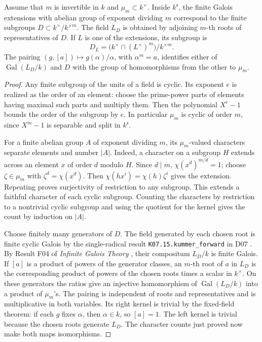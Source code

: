 \begin{theorem}
\label{res:GH07}
Assume that \(m\) is invertible in \(k\) and
\(\mu_m\subset k^\times\). Inside \(k^{\mathrm s}\), the finite Galois
extensions with abelian group of exponent dividing \(m\)
correspond to the finite subgroups \(D\subset k^\times/k^{\times m}\).
The field \(L_D\) is obtained by adjoining \(m\)-th roots of
representatives of \(D\). If \(L\) is one of the extensions, its
subgroup is
\[
 D_L=\bigl(k^\times\cap (L^\times)^m\bigr)/k^{\times m}.
\]
The pairing \((g,[a])\mapsto g(\alpha)/\alpha\), with \(\alpha^m=a\),
identifies either of \(\operatorname{Gal}(L_D/k)\) and \(D\) with the
group of homomorphisms from the other to \(\mu_m\).
\end{theorem}
\begin{proof}
Any finite subgroup of the units of a field is cyclic. Its exponent
\(e\) is realized as the order of an element: choose the prime-power
parts of elements having maximal such parts and multiply them.
Then the polynomial \(X^e-1\) bounds the order of the subgroup by \(e\).
In particular \(\mu_m\) is cyclic of order \(m\), since \(X^m-1\) is
separable and split in \(k^{\mathrm s}\).

For a finite abelian group \(A\) of exponent dividing \(m\), its
\(\mu_m\)-valued characters separate elements and number \(|A|\).
Indeed, a character on a subgroup \(H\) extends across an element
\(x\) of order \(d\) modulo \(H\). Since \(d\mid m\),
\(\chi(x^d)^{m/d}=1\); choose \(\zeta\in\mu_m\) with
\(\zeta^d=\chi(x^d)\). Then
\(\chi(hx^i)=\chi(h)\zeta^i\) gives the extension. Repeating proves
surjectivity of restriction to any subgroup. This extends a faithful
character of each cyclic subgroup. Counting the characters by
restriction to a nontrivial cyclic subgroup and using the quotient
for the kernel gives the count by induction on \(|A|\).

Choose finitely many generators of \(D\). The field generated by
each chosen root is finite cyclic Galois by the single-radical
result \texttt{K07.15.kummer\_forward} in D07
\cite[PDF p.~135]{mg-d07}. By Result F04 of
\emph{Infinite Galois Theory} \cite[PDF p.~5]{mg-aft},
their compositum \(L_D/k\) is finite Galois.
If \([a]\) is a product of powers of the generator classes, an
\(m\)-th root of \(a\) in \(L_D\) is the corresponding product of
powers of the chosen roots times a scalar in \(k^\times\).
On these generators the ratios give an injective homomorphism
of \(\operatorname{Gal}(L_D/k)\) into a product of \(\mu_m\)'s.
The pairing is independent of roots and representatives and is
multiplicative in both variables. Its right kernel is trivial by
the fixed-field theorem: if each \(g\) fixes \(\alpha\), then
\(\alpha\in k\), so \([a]=1\). The left kernel is trivial because
the chosen roots generate \(L_D\). The character counts just proved
now make both maps isomorphisms.


\end{proof}

